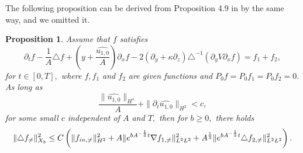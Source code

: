 \documentclass[12pt, reqno]{amsart}
\newtheorem{proposition}{Proposition}[section]
\numberwithin{equation}{section}
\begin{document}
	The following proposition can be derived from Proposition 4.9 in \cite{wei2} by the same way, and we omitted it.
	\begin{proposition}\label{timespace4}
		Assume that $f$ satisfies 
		$$\partial_t f-\frac{1}{A}\triangle f+\left(y+\frac{\widehat{u_{1,0}}}{A}\right)\partial_xf-2(\partial_y+\kappa\partial_z)
		\triangle^{-1}(\partial_yV\partial_xf)=f_{1}+f_{2},$$
		for $ t\in[0,T], $ where $ f, f_{1} $ and $ f_{2} $ are given functions and $ P_{0}f=P_{0}f_{1}=P_{0}f_{2}=0. $
		As long as $$\frac{\|\widehat{u_{1,0}}\|_{H^4}}{A}+\|\partial_t\widehat{u_{1,0}}\|_{H^2}<c,$$
		for some small $c$ independent of $A$ and $T,$ then for $ b\geq 0, $ there holds  
		\begin{equation*}
			\begin{aligned}
				\|\triangle f_{\neq}\|^2_{X_b}
				\leq C\left(\|f_{\rm in,\neq}\|_{H^2}^2
				+A\|{\rm e}^{bA^{-\frac{1}{3}}t}\nabla f_{1,\neq}\|_{L^2L^2}^2+A^{\frac13}\|e^{bA^{-\frac13}t}\triangle f_{2,\neq}\|_{L^{2}L^{2}}^{2}\right).
			\end{aligned}
		\end{equation*}
	\end{proposition}
	
\end{document}
